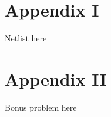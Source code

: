 \documentclass[12pt,english]{article}
\begin{document}

\section{Appendix I}
Netlist here



\section{Appendix II}
Bonus problem here
\end{document}
